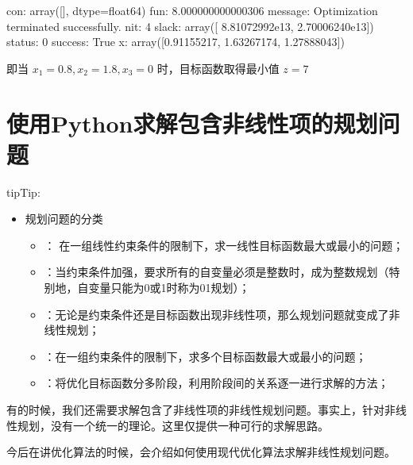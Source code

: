\documentclass[letterpaper,10pt,english]{sphinxmanual}
\begin{document}
\begin{sphinxVerbatim}[commandchars=\\\{\}]
     con: array([], dtype=float64)
     fun: 8.000000000000306
 message: \PYGZsq{}Optimization terminated successfully.\PYGZsq{}
     nit: 4
   slack: array([ 8.81072992e\PYGZhy{}13, \PYGZhy{}2.70006240e\PYGZhy{}13])
  status: 0
 success: True
       x: array([0.91155217, 1.63267174, 1.27888043])
\end{sphinxVerbatim}

即当 \(x_1 = 0.8, x_2 = 1.8, x_3 = 0\) 时，目标函数取得最小值 \(z = 7\)


\section{使用Python求解包含非线性项的规划问题}
\label{\detokenize{docs/LP:id9}}
\begin{sphinxadmonition}{tip}{Tip:}\begin{itemize}
\item {} 
规划问题的分类
\begin{itemize}
\item {} 
： 在一组线性约束条件的限制下，求一线性目标函数最大或最小的问题；

\item {} 
：当约束条件加强，要求所有的自变量必须是整数时，成为整数规划（特别地，自变量只能为0或1时称为0\sphinxhyphen{}1规划）；

\item {} 
：无论是约束条件还是目标函数出现非线性项，那么规划问题就变成了非线性规划；

\item {} 
：在一组约束条件的限制下，求多个目标函数最大或最小的问题；

\item {} 
：将优化目标函数分多阶段，利用阶段间的关系逐一进行求解的方法；

\end{itemize}

\end{itemize}
\end{sphinxadmonition}

有的时候，我们还需要求解包含了非线性项的非线性规划问题。事实上，针对非线性规划，没有一个统一的理论。这里仅提供一种可行的求解思路。

今后在讲优化算法的时候，会介绍如何使用现代优化算法求解非线性规划问题。
\end{document}
